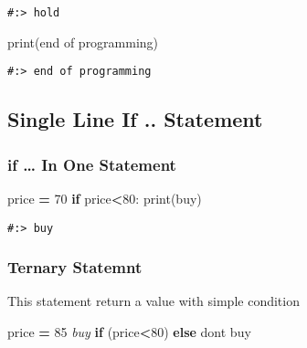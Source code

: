 \documentclass[
]{book}
\newenvironment{Shaded}{\begin{snugshade}}{\end{snugshade}}
\newcommand{\BuiltInTok}[1]{#1}
\newcommand{\CommentTok}[1]{\textcolor[rgb]{0.37,0.37,0.37}{\textit{#1}}}
\newcommand{\ControlFlowTok}[1]{\textcolor[rgb]{0.27,0.27,0.27}{\textbf{#1}}}
\newcommand{\DecValTok}[1]{\textcolor[rgb]{0.06,0.06,0.06}{#1}}
\newcommand{\NormalTok}[1]{#1}
\newcommand{\OperatorTok}[1]{\textcolor[rgb]{0.43,0.43,0.43}{\textbf{#1}}}
\newcommand{\StringTok}[1]{\textcolor[rgb]{0.5,0.5,0.5}{#1}}
\begin{document}
\begin{verbatim}
#:> hold
\end{verbatim}

\begin{Shaded}
\begin{Highlighting}[]
\BuiltInTok{print}\NormalTok{(}\StringTok{\textquotesingle{}end of programming\textquotesingle{}}\NormalTok{)}
\end{Highlighting}
\end{Shaded}

\begin{verbatim}
#:> end of programming
\end{verbatim}

\hypertarget{single-line-if-..-statement}{%
\subsection{Single Line If .. Statement}\label{single-line-if-..-statement}}

\hypertarget{if-in-one-statement}{%
\subsubsection{if \ldots{} In One Statement}\label{if-in-one-statement}}

\begin{Shaded}
\begin{Highlighting}[]
\NormalTok{price }\OperatorTok{=} \DecValTok{70}
\ControlFlowTok{if}\NormalTok{ price}\OperatorTok{\textless{}}\DecValTok{80}\NormalTok{: }\BuiltInTok{print}\NormalTok{(}\StringTok{\textquotesingle{}buy\textquotesingle{}}\NormalTok{)}
\end{Highlighting}
\end{Shaded}

\begin{verbatim}
#:> buy
\end{verbatim}

\hypertarget{ternary-statemnt}{%
\subsubsection{Ternary Statemnt}\label{ternary-statemnt}}

This statement return a value with simple condition

\begin{Shaded}
\begin{Highlighting}[]
\NormalTok{price }\OperatorTok{=} \DecValTok{85}
\CommentTok{\textquotesingle{}buy\textquotesingle{}} \ControlFlowTok{if}\NormalTok{ (price}\OperatorTok{\textless{}}\DecValTok{80}\NormalTok{) }\ControlFlowTok{else} \StringTok{\textquotesingle{}dont buy\textquotesingle{}}
\end{Highlighting}
\end{Shaded}
\end{document}
